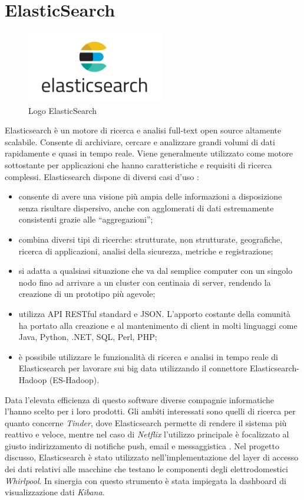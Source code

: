 \section{ElasticSearch}
\begin{figure}[ht!]
\begin{center}
  \includegraphics[width=6cm]{images/esearch.png}
  \caption{Logo ElasticSearch}
\end{center}
\end{figure}
Elasticsearch è un motore di ricerca e analisi full-text open source altamente scalabile. Consente di archiviare, cercare e analizzare grandi volumi di dati rapidamente e quasi in tempo reale. Viene generalmente utilizzato come motore sottostante per applicazioni che hanno caratteristiche e requisiti di ricerca complessi.
Elasticsearch dispone di diversi casi d'uso \cite{ELASTICSEARCH}:
\begin{itemize}
    \item consente di avere una visione più ampia delle informazioni a disposizione senza risultare dispersivo, anche con agglomerati di dati estremamente consistenti grazie alle ``aggregazioni'';
    \item combina diversi tipi di ricerche: strutturate, non strutturate, geografiche, ricerca di applicazioni, analisi della sicurezza, metriche e registrazione;
    \item si adatta a qualsiasi situazione che va dal semplice computer con un singolo nodo fino ad arrivare a un cluster con centinaia di server, rendendo la creazione di un prototipo più agevole;
    \item utilizza API RESTful standard e JSON. L'apporto costante della comunità ha portato alla creazione e al mantenimento di client in molti linguaggi come Java, Python, .NET, SQL, Perl, PHP;
    \item è possibile utilizzare le funzionalità di ricerca e analisi in tempo reale di Elasticsearch per lavorare sui big data utilizzando il connettore Elasticsearch-Hadoop (ES-Hadoop).
\end{itemize}
Data l'elevata efficienza di questo software diverse compagnie informatiche l'hanno scelto per i loro prodotti. Gli ambiti interessati sono quelli di ricerca per quanto concerne \textit{Tinder}, dove Elasticsearch permette di rendere il sistema più reattivo e veloce, mentre nel caso di \textit{Netflix} l'utilizzo principale è focalizzato al giusto indirizzamento di notifiche push, email e messaggistica \cite{ELASTICSEARCH}.
Nel progetto discusso, Elasticsearch è stato utilizzato nell'implementazione del layer di accesso dei dati relativi alle macchine che testano le componenti degli elettrodomestici \textit{Whirlpool}. In sinergia con questo strumento è stata impiegata la dashboard di visualizzazione dati \textit{Kibana}.

